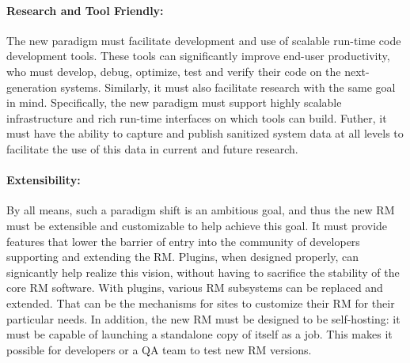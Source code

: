 \documentclass{article}
\newcommand{\ngrm}{NGRM}
\begin{document}
\paragraph{Research and Tool Friendly:}
The new paradigm must facilitate development and use of 
scalable run-time code development tools. These tools can significantly 
improve end-user productivity, who must develop, debug, optimize, 
test and verify their code on the next-generation systems. 
Similarly, it must
also facilitate research with the same goal in mind.
Specifically, the new paradigm must support highly scalable infrastructure
and rich run-time interfaces
on which tools can build. Futher, it must have 
the ability to capture and
publish sanitized system data at all levels to facilitate the use of
this data in current and future research. 


\paragraph{Extensibility:}
By all means, such a paradigm shift is an ambitious goal, and thus
the new RM must be extensible and customizable to help achieve this goal.
It must provide features that lower the barrier of entry into the
community of developers supporting and extending the RM.
Plugins, when designed properly, can signicantly help realize this vision,
without having to sacrifice the stability of the core RM software. 
With plugins, various RM subsystems can be replaced and extended.  
That can be the mechanisms for
sites to customize their RM for their particular needs. 
In addition, the new RM must be designed to be self-hosting: it must  
be capable of launching a standalone copy of itself as a job. This makes
it possible for developers or a QA team to test new RM versions. 

%
\end{document}
